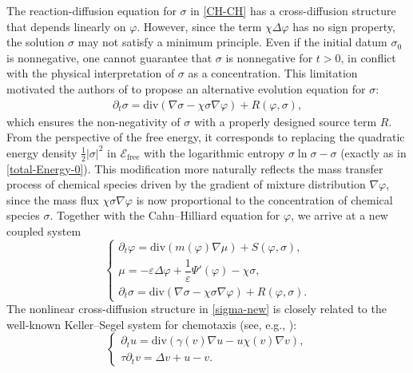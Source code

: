 \documentclass[11pt,reqno]{amsart}
\def\div{\mathrm{div}}
\begin{document}
The reaction-diffusion equation for $\sigma$ in \eqref{CH-CH} has a cross-diffusion structure that depends linearly on $\varphi$. However, since the term $\chi\Delta \varphi$ has no sign property, the solution $\sigma$ may not satisfy a minimum principle. Even if the initial datum $\sigma_0$ is nonnegative, one cannot guarantee that $\sigma$ is nonnegative for $t>0$, in conflict with the physical interpretation of $\sigma$ as a concentration. This limitation motivated the authors of \cite{RSS2023} to propose an alternative evolution equation for $\sigma$:
%
\begin{align}
\partial _t\sigma = \div(\nabla  \sigma - \chi   \sigma\nabla \varphi) + R(\varphi,\sigma),\label{sigma-new}
\end{align}
%
which ensures the non-negativity of $\sigma$ with a properly designed source term $R$. From the perspective of the free energy, it corresponds to replacing the quadratic energy density $\frac12|\sigma|^2$ in $\mathcal{E}_{\text{free}}$ with the logarithmic entropy $\sigma\ln \sigma -\sigma$ (exactly as in \eqref{total-Energy-0}). This modification more naturally reflects the mass transfer
process of chemical species driven by the gradient of mixture distribution $\nabla \varphi$, since the mass flux $\chi\sigma\nabla \varphi$ is now proportional to the concentration of chemical species $\sigma$. Together with the Cahn--Hilliard equation for $\varphi$, we arrive at a new coupled system
%
\begin{equation}
\left\{ \begin{array}{l}
\partial_t \varphi = \div(m(\varphi)\nabla \mu) +S(\varphi,\sigma),
\\
\mu= -\varepsilon \Delta \varphi+ \dfrac{1}{\varepsilon} \Psi'(\varphi) -\chi \sigma,
\\
\partial _t\sigma = \div(\nabla  \sigma - \chi   \sigma\nabla \varphi) + R(\varphi,\sigma).
 \end{array} \right.
 \label{CH-KS}
\end{equation}
%
The nonlinear cross-diffusion structure in \eqref{sigma-new} is closely related to the well-known Keller--Segel system for chemotaxis (see, e.g., \cite{BBTW,Hor2004,KS}):
%
\begin{equation}
\left\{ \begin{array}{l}
\partial_t u=\mathrm{div}(\gamma (v)\nabla u-u\chi (v)\nabla v),\\
\tau \partial_t v=\Delta v + u -v.
\end{array} \right.
\label{KS-a}
\end{equation}
\end{document}
